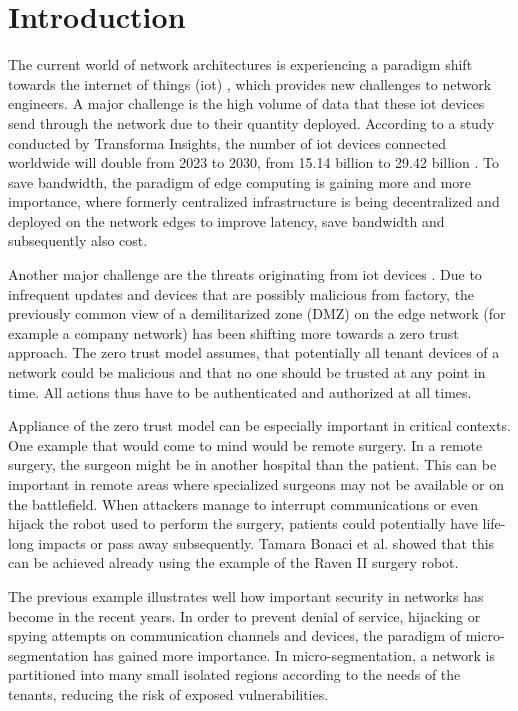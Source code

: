 \chapter{Introduction}

The current world of network architectures is experiencing a paradigm shift towards the internet of things (\acrshort{iot}) \cite{iot}, which provides new challenges to network engineers. A major challenge is the high volume of data that these \acrshort{iot} devices send through the network due to their quantity deployed. According to a study conducted by Transforma Insights, the number of \acrshort{iot} devices connected worldwide will double from 2023 to 2030, from 15.14 billion to 29.42 billion \cite{iotincrease}. To save bandwidth, the paradigm of edge computing \cite{edgecomputing} is gaining more and more importance, where formerly centralized infrastructure is being decentralized and deployed on the network edges to improve latency, save bandwidth and subsequently also cost.

Another major challenge are the threats originating from \acrshort{iot} devices \cite{iotthreats}. Due to infrequent updates and devices that are possibly malicious from factory, the previously common view of a demilitarized zone (DMZ) on the edge network (for example a company network) has been shifting more towards a zero trust approach. The zero trust model \cite{zerotrust} assumes, that potentially all tenant devices of a network could be malicious and that no one should be trusted at any point in time. All actions thus have to be authenticated and authorized at all times.

Appliance of the zero trust model can be especially important in critical contexts. One example that would come to mind would be remote surgery. In a remote surgery, the surgeon might be in another hospital than the patient. This can be important in remote areas where specialized surgeons may not be available or on the battlefield. When attackers manage to interrupt communications or even hijack the robot used to perform the surgery, patients could potentially have life-long impacts or pass away subsequently. Tamara Bonaci et al. \cite{remotesurgeryhijacking} showed that this can be achieved already using the example of the Raven II surgery robot.

The previous example illustrates well how important security in networks has become in the recent years. In order to prevent denial of service, hijacking or spying attempts on communication channels and devices, the paradigm of micro-segmentation \cite{zerotrust} has gained more importance. In micro-segmentation, a network is partitioned into many small isolated regions according to the needs of the tenants, reducing the risk of exposed vulnerabilities.

